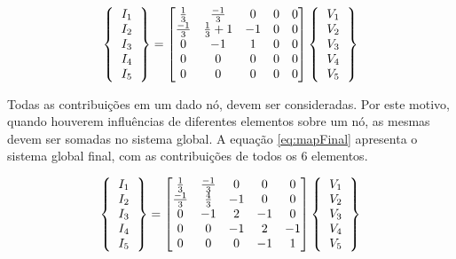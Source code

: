 \documentclass[
    12pt,               %
    openright,          %
    oneside,
    a4paper,            %
    english,            %
    french,             %
    spanish,            %
    brazil              %
    ]{abntex2}
\begin{document}
\begin{apendicesenv}
\begin{equation}
\label{eq:mapE2}
\left \{
\begin{tabular}{c}
$I_1$ \\
$I_2$ \\
$I_3$ \\
$I_4$ \\
$I_5$          
\end{tabular}       
\right \}
=
\begin{bmatrix}
\frac{1}{3} & \frac{-1}{3}  & 0 & 0 & 0 \\
\frac{-1}{3} & \frac{1}{3}+1  & -1 & 0 & 0 \\
0 & -1 & 1 & 0 & 0 \\
0 & 0 & 0 & 0 & 0 \\
0 & 0 & 0 & 0 & 0 \\
\end{bmatrix} 
\left \{
\begin{tabular}{c}
$V_1$ \\
$V_2$ \\
$V_3$ \\
$V_4$ \\
$V_5$          
\end{tabular}       
\right \}	                     
\end{equation}

Todas as contribuições em um dado nó, devem ser consideradas. Por este motivo, quando houverem influências de diferentes elementos sobre um nó, as mesmas devem ser somadas no sistema global. A equação \ref{eq:mapFinal} apresenta o sistema global final, com as contribuições de todos os $6$ elementos.

\begin{equation}
\label{eq:mapFinal}
\left \{
\begin{tabular}{c}
$I_1$ \\
$I_2$ \\
$I_3$ \\
$I_4$ \\
$I_5$          
\end{tabular}       
\right \}
=
\begin{bmatrix}
\frac{1}{3} & \frac{-1}{3}  & 0 & 0 & 0 \\
\frac{-1}{3} & \frac{4}{3}  & -1 & 0 & 0 \\
0 & -1 & 2 & -1 & 0 \\
0 & 0 & -1 & 2 & -1 \\
0 & 0 & 0 & -1 & 1 \\
\end{bmatrix} 
\left \{
\begin{tabular}{c}
$V_1$ \\
$V_2$ \\
$V_3$ \\
$V_4$ \\
$V_5$          
\end{tabular}       
\right \}	                     
\end{equation}



\end{apendicesenv}
\end{document}
